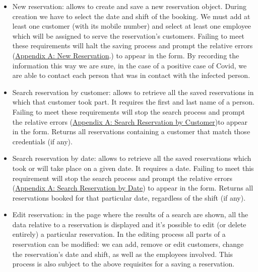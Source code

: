 \documentclass{article}
\begin{document}
    \begin{itemize}
        \item New reservation: allows to create and save a new reservation object.
        During creation we have to select the date and shift of the booking.
        We must add at least one customer (with its mobile
        number) and select at least one employee which will be assigned to serve
        the reservation's customers.
        Failing to meet these requirements will halt the saving
        process and prompt the relative errors
        (\hyperref[sec:new_reservation_form_errors]{Appendix A: New Reservation}.)
        to appear in the form.
        By recording the information this way we are sure, in the case of
        a positive case of Covid, we are able to contact each person that
        was in contact with the infected person.


        \item Search reservation by customer: allows to retrieve all the saved
        reservations in which that customer took part.
        It requires the first and last name of a person.
        Failing to meet these requirements will stop the search process
        and prompt the relative errors
        (\hyperref[sec:search_reservation_by_customer_errors]
        {Appendix A: Search Reservation by Customer})to appear in the form.
        Returns all reservations containing a customer that match
        those credentials (if any).

        \item Search reservation by date: allows to retrieve all the saved reservations
        which took or will take place on a given date.
        It requires a date. Failing to meet this requirement will stop the search
        process and prompt the relative errors
        (\hyperref[sec:search_reservation_by_date_errors]{Appendix A: Search Reservation
        by Date}) to appear in the form.
        Returns all reservations booked for that particular date,
        regardless of the shift (if any).

        \item Edit reservation: in the page where the results of a search are shown,
        all the data relative to a reservation is displayed and it's possible
        to edit (or delete entirely) a particular reservation.
        In the editing process all parts of a reservation can be modified:
        we can add, remove or edit customers, change the reservation's date and shift,
        as well as the employees involved. This process is also subject to the
        above requisites for a saving a reservation.
    \end{itemize}
\end{document}
